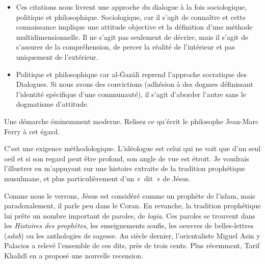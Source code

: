 \begin{itemize}
\item
  Ces citations nous livrent une approche du dialogue à la fois
  sociologique, politique et philosophique. Sociologique, car il s'agit
  de connaître et cette connaissance implique une attitude objective et
  la définition d'une méthode multidimensionnelle. Il ne s'agit pas
  seulement de décrire, mais il s'agit de s'assurer de la compréhension,
  de percer la réalité de l'intérieur et pas uniquement de l'extérieur.
\item
  Politique et philosophique car al-Ġazālī reprend l'approche socratique
  des Dialogues. Si nous avons des convictions (adhésion à des dogmes
  définissant l'identité spécifique d'une communauté), il s'agit
  d'aborder l'autre sans le dogmatisme d'attitude.
\end{itemize}

Une démarche éminemment moderne. Relisez ce qu'écrit le philosophe
Jean-Marc Ferry à cet égard.


C'est une exigence méthodologique. L'idéologue est celui qui ne voit que
d'un seul  oeil et si son regard peut être profond, son angle de vue est
étroit. Je voudrais l'illustrer en m'appuyant sur une histoire extraite
de la tradition prophétique musulmane, et plus particulièrement d'un
«~dit~» de Jésus.

Comme nous le verrons, Jésus est considéré comme un prophète de l'islam,
mais paradoxalement, il parle peu dans le Coran. En revanche, la
tradition prophétique lui prête un nombre important de paroles, de
\emph{logia}. Ces paroles se trouvent dans les \emph{Histoires des
prophètes}, les enseignements soufis, les  oeuvres de belles-lettres
(\emph{adab}) ou les anthologies de sagesse. Au siècle dernier,
l'orientaliste Miguel Asin y Palacios a relevé l'ensemble de ces dits,
près de trois cents. Plus récemment, Tarif Khalidî en a proposé une
nouvelle recension.


